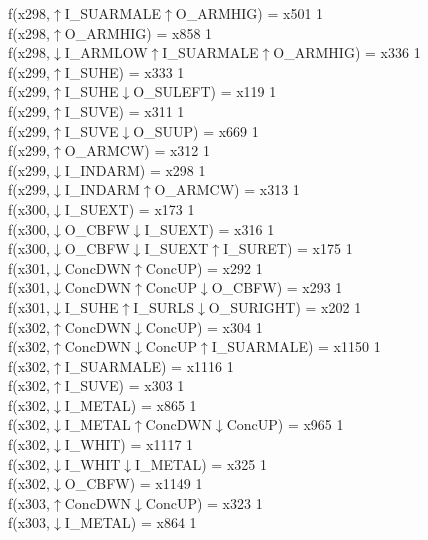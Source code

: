 f(x298,$\uparrow$I\_SUARMALE$\uparrow$O\_ARMHIG) = x501 {1} \\
f(x298,$\uparrow$O\_ARMHIG) = x858 {1} \\
f(x298,$\downarrow$I\_ARMLOW$\uparrow$I\_SUARMALE$\uparrow$O\_ARMHIG) = x336 {1} \\
f(x299,$\uparrow$I\_SUHE) = x333 {1} \\
f(x299,$\uparrow$I\_SUHE$\downarrow$O\_SULEFT) = x119 {1} \\
f(x299,$\uparrow$I\_SUVE) = x311 {1} \\
f(x299,$\uparrow$I\_SUVE$\downarrow$O\_SUUP) = x669 {1} \\
f(x299,$\uparrow$O\_ARMCW) = x312 {1} \\
f(x299,$\downarrow$I\_INDARM) = x298 {1} \\
f(x299,$\downarrow$I\_INDARM$\uparrow$O\_ARMCW) = x313 {1} \\
f(x300,$\downarrow$I\_SUEXT) = x173 {1} \\
f(x300,$\downarrow$O\_CBFW$\downarrow$I\_SUEXT) = x316 {1} \\
f(x300,$\downarrow$O\_CBFW$\downarrow$I\_SUEXT$\uparrow$I\_SURET) = x175 {1} \\
f(x301,$\downarrow$ConcDWN$\uparrow$ConcUP) = x292 {1} \\
f(x301,$\downarrow$ConcDWN$\uparrow$ConcUP$\downarrow$O\_CBFW) = x293 {1} \\
f(x301,$\downarrow$I\_SUHE$\uparrow$I\_SURLS$\downarrow$O\_SURIGHT) = x202 {1} \\
f(x302,$\uparrow$ConcDWN$\downarrow$ConcUP) = x304 {1} \\
f(x302,$\uparrow$ConcDWN$\downarrow$ConcUP$\uparrow$I\_SUARMALE) = x1150 {1} \\
f(x302,$\uparrow$I\_SUARMALE) = x1116 {1} \\
f(x302,$\uparrow$I\_SUVE) = x303 {1} \\
f(x302,$\downarrow$I\_METAL) = x865 {1} \\
f(x302,$\downarrow$I\_METAL$\uparrow$ConcDWN$\downarrow$ConcUP) = x965 {1} \\
f(x302,$\downarrow$I\_WHIT) = x1117 {1} \\
f(x302,$\downarrow$I\_WHIT$\downarrow$I\_METAL) = x325 {1} \\
f(x302,$\downarrow$O\_CBFW) = x1149 {1} \\
f(x303,$\uparrow$ConcDWN$\downarrow$ConcUP) = x323 {1} \\
f(x303,$\downarrow$I\_METAL) = x864 {1} \\

